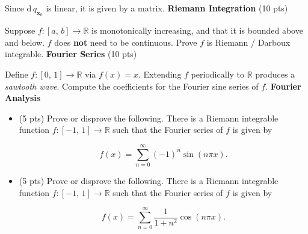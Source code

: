 \documentclass{article}
\begin{document}
    Since $\textrm{d}\,q_{\mathbf{x}_{0}}$ is linear, it is given by a
    matrix.
    \newpage
    \textbf{Riemann Integration} (10 pts)
    \par
    Suppose $f:[a,\,b]\rightarrow\mathbb{R}$ is monotonically
    increasing, and that it is bounded above and below.
    $f$ does \textbf{not} need to be continuous. Prove $f$
    is Riemann / Darboux integrable.
    \newpage
    \textbf{Fourier Series} (10 pts)
    \par
    Define $f:[0,\,1]\rightarrow\mathbb{R}$ via $f(x)=x$. Extending
    $f$ periodically to $\mathbb{R}$ produces a
    \textit{sawtooth wave}. Compute the coefficients for the
    Fourier sine series of $f$.
    \newpage
    \textbf{Fourier Analysis}
    \begin{itemize}
        \item (5 pts)
            Prove or disprove the following.
            There is a Riemann integrable function
            $f:[-1,\,1]\rightarrow\mathbb{R}$ such that the
            Fourier series of $f$ is given by

            \begin{equation}
                f(x)
                =
                \sum_{n=0}^{\infty}
                    (-1)^{n}
                    \sin(n\pi{x}).
            \end{equation}

        \item (5 pts)
            Prove or disprove the following.
            There is a Riemann integrable function
            $f:[-1,\,1]\rightarrow\mathbb{R}$ such that the
            Fourier series of $f$ is given by

            \begin{equation}
                f(x)
                =
                \sum_{n=0}^{\infty}
                    \frac{1}{1+n^{2}}
                    \cos(n\pi{x}).
            \end{equation}
    \end{itemize}
\end{document}
